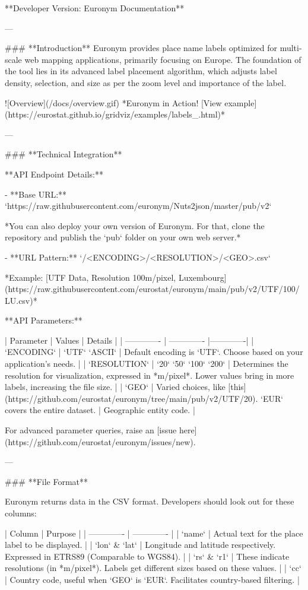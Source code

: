 **Developer Version: Euronym Documentation**

---

### **Introduction**
Euronym provides place name labels optimized for multi-scale web mapping applications, primarily focusing on Europe. The foundation of the tool lies in its advanced label placement algorithm, which adjusts label density, selection, and size as per the zoom level and importance of the label.

![Overview](/docs/overview.gif)
*Euronym in Action! [View example](https://eurostat.github.io/gridviz/examples/labels_.html)*

---

### **Technical Integration**

**API Endpoint Details:**

- **Base URL:** `https://raw.githubusercontent.com/euronym/Nuts2json/master/pub/v2`

  *You can also deploy your own version of Euronym. For that, clone the repository and publish the `pub` folder on your own web server.*

- **URL Pattern:** `/<ENCODING>/<RESOLUTION>/<GEO>.csv`

  *Example: [UTF Data, Resolution 100m/pixel, Luxembourg](https://raw.githubusercontent.com/eurostat/euronym/main/pub/v2/UTF/100/LU.csv)*

**API Parameters:**

| Parameter | Values | Details |
| ------------- | ------------- |-------------|
| `ENCODING` | `UTF` `ASCII` | Default encoding is `UTF`. Choose based on your application's needs. |
| `RESOLUTION` | `20` `50` `100` `200` | Determines the resolution for visualization, expressed in *m/pixel*. Lower values bring in more labels, increasing the file size. |
| `GEO` | Varied choices, like [this](https://github.com/eurostat/euronym/tree/main/pub/v2/UTF/20). `EUR` covers the entire dataset. | Geographic entity code. |

For advanced parameter queries, raise an [issue here](https://github.com/eurostat/euronym/issues/new).

---

### **File Format**

Euronym returns data in the CSV format. Developers should look out for these columns:

| Column | Purpose |
| ------------- | ------------- |
| `name` | Actual text for the place label to be displayed. |
| `lon` & `lat` | Longitude and latitude respectively. Expressed in ETRS89 (Comparable to WGS84). |
| `rs` & `r1` | These indicate resolutions (in *m/pixel*). Labels get different sizes based on these values. |
| `cc` | Country code, useful when `GEO` is `EUR`. Facilitates country-based filtering. |

